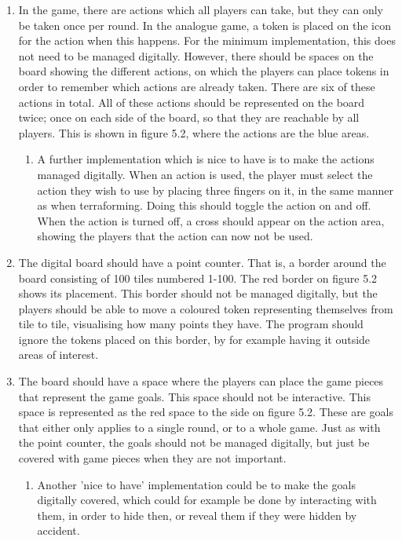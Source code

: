\begin{enumerate}
\begin{enumerate}
	\end{enumerate}
\item In the game, there are actions which all players can take, but they can only be taken once per round. In the analogue game, a token is placed on the icon for the action when this happens. For the minimum implementation, this does not need to be managed digitally. However, there should be spaces on the board showing the different actions, on which the players can place tokens in order to remember which actions are already taken. There are six of these actions in total. All of these actions should be represented on the board twice; once on each side of the board, so that they are reachable by all players. This is shown in figure 5.2, where the actions are the blue areas. 
	\begin{enumerate}
	\item A further implementation which is nice to have is to make the actions managed digitally. When an action is used, the player must select the action they wish to use by placing three fingers on it, in the same manner as when terraforming. Doing this should toggle the action on and off. When the action is turned off, a cross should appear on the action area, showing the players that the action can now not be used.
	\end{enumerate}
\item The digital board should have a point counter. That is, a border around the board consisting of 100 tiles numbered 1-100. The red border on figure 5.2 shows its placement. This border should not be managed digitally, but the players should be able to move a coloured token representing themselves from tile to tile, visualising how many points they have. The program should ignore the tokens placed on this border, by for example having it outside areas of interest.
\item The board should have a space where the players can place the game pieces that represent the game goals. This space should not be interactive. This space is represented as the red space to the side on figure 5.2. These are goals that either only applies to a single round, or to a whole game. Just as with the point counter, the goals should not be managed digitally, but just be covered with game pieces when they are not important.
	\begin{enumerate}
	\item Another 'nice to have' implementation could be to make the goals digitally covered, which could for example be done by interacting with them, in order to hide then, or reveal them if they were hidden by accident.
	\end{enumerate}
\end{enumerate}
